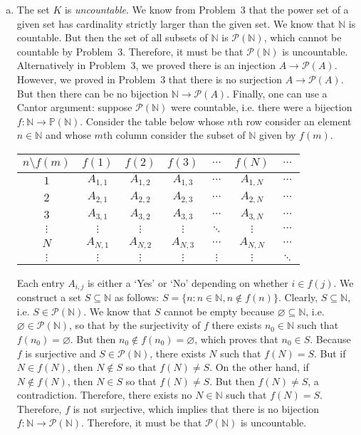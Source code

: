 \documentclass[11pt,letterpaper]{article}
\begin{document}
\begin{enumerate}[(a)]
\item The set $K$ is \textit{uncountable}. We know from Problem~3 that the power set of a given set has cardinality strictly larger than the given set. We know that $\mathbb{N}$ is countable. But then the set of all subsets of $\mathbb{N}$ is $\mathcal{P}(\mathbb{N})$, which cannot be countable by Problem~3. Therefore, it must be that $\mathcal{P}(\mathbb{N})$ is uncountable. Alternatively in Problem~3, we proved there is an injection $A \to \mathcal{P}(A)$. However, we proved in Problem~3 that there is no surjection $A \to \mathcal{P}(A)$. But then there can be no bijection $\mathbb{N} \to \mathcal{P}(A)$. Finally, one can use a Cantor argument: suppose $\mathcal{P}(\mathbb{N})$ were countable, i.e. there were a bijection $f: \mathbb{N} \to \mathbb{P}(\mathbb{N})$. Consider the table below whose $n$th row consider an element $n \in \mathbb{N}$ and whose $m$th column consider the subset of $\mathbb{N}$ given by $f(m)$. \par
	\begin{table}[ht]
	\centering
	\begin{tabular}{c|cccccc}
	$n \setminus f(m)$ & $f(1)$ & $f(2)$ & $f(3)$ & $\cdots$ & $f(N)$ & $\cdots$ \\ \hline
	$1$ & $A_{1,1}$ & $A_{1,2}$ & $A_{1,3}$ & $\cdots$ & $A_{1,N}$ & $\cdots$ \\
	$2$ & $A_{2,1}$ & $A_{2,2}$ & $A_{2,3}$ & $\cdots$ & $A_{2,N}$ & $\cdots$ \\
	$3$ & $A_{3,1}$ & $A_{3,2}$ & $A_{3,3}$ & $\cdots$ & $A_{3,N}$ & $\cdots$ \\
	$\vdots$ & $\vdots$ & $\vdots$ & $\vdots$ & $\ddots$ & $\vdots$ & $\cdots$ \\
	$N$ & $A_{N,1}$ & $A_{N,2}$ & $A_{N,3}$ & $\cdots$ & $A_{N,N}$ & $\cdots$ \\
	$\vdots$ & $\vdots$ & $\vdots$ & $\vdots$ & $\vdots$ & $\vdots$ & $\ddots$ 
	\end{tabular}
	\end{table} \par
Each entry $A_{i,j}$ is either a `Yes' or `No' depending on whether $i \in f(j)$. We construct a set $S \subseteq \mathbb{N}$ as follows: $S= \{ n \colon n \in \mathbb{N}, n \notin f(n) \}$. Clearly, $S \subseteq \mathbb{N}$, i.e. $S \in \mathcal{P}(\mathbb{N})$. We know that $S$ cannot be empty because $\varnothing \subseteq \mathbb{N}$, i.e. $\varnothing \in \mathcal{P}(\mathbb{N})$, so that by the surjectivity of $f$ there exists $n_0 \in \mathbb{N}$ such that $f(n_0)= \varnothing$. But then $n_0 \notin f(n_0)= \varnothing$, which proves that $n_0 \in S$. Because $f$ is surjective and $S \in \mathcal{P}(\mathbb{N})$, there exists $N$ such that $f(N)= S$. But if $N \in f(N)$, then $N \notin S$ so that $f(N) \neq S$. On the other hand, if $N \notin f(N)$, then $N \in S$ so that $f(N) \neq S$. But then $f(N) \neq S$, a contradiction. Therefore, there exists no $N \in \mathbb{N}$ such that $f(N)= S$. Therefore, $f$ is not surjective, which implies that there is no bijection $f: \mathbb{N} \to \mathcal{P}(\mathbb{N})$. Therefore, it must be that $\mathcal{P}(\mathbb{N})$ is uncountable. 
\end{enumerate}
\end{document}
